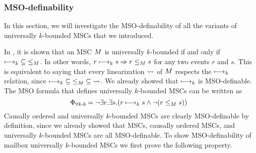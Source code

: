 \documentclass{article}
\begin{document}
\subsubsection{MSO-definability}

In this section, we will investigate the MSO-definability of all the variants of universally $k$-bounded MSCs that we introduced.

In \cite{DBLP:conf/fossacs/LohreyM02}, it is shown that an MSC $M$ is universally $k$-bounded if and only if $\longmapsto_k \;\subseteq\; \le_M$. In other words, $r \longmapsto_k s \Rightarrow r \le_M s$ for any two events $r$ and $s$. This is equivalent to saying that every linearization $\rightsquigarrow$ of $M$ respects the $\longmapsto_k$ relation, since $\longmapsto_k \;\subseteq\; \le_M \;\subseteq\; \rightsquigarrow$. We already showed that $\longmapsto_k$ is MSO-definable. The MSO formula that defines universally $k$-bounded  MSCs can be written as
\[ \Phi_{\forall k\text{-}b} = \neg \exists r.\exists s.(r \longmapsto_k s \wedge \neg(r \le_M s)) \]
Causally ordered and \pp universally $k$-bounded MSCs are clearly MSO-definable by definition, since we already showed that \pp MSCs, causally ordered MSCs, and universally $k$-bounded MSCs are all MSO-definable. To show MSO-definability of mailbox universally $k$-bounded MSCs we first prove the following property.
\end{document}
